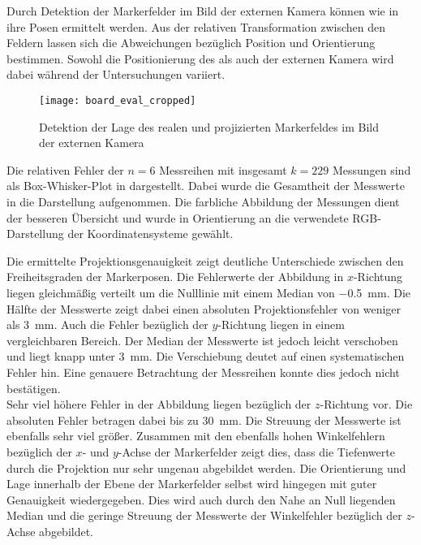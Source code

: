 Durch Detektion der Markerfelder im Bild der externen Kamera können wie in  ihre Posen ermittelt werden. Aus der relativen Transformation zwischen den Feldern lassen sich die Abweichungen bezüglich Position und Orientierung bestimmen. Sowohl die Positionierung des  als auch der externen Kamera wird dabei während der Untersuchungen variiert.\\

\begin{figure}[!ht]
	\begin{center}
		\texttt{[image: board\_eval\_cropped]}
		\caption{Detektion der Lage des realen und projizierten Markerfeldes im Bild der externen Kamera}
		\label{fig.arprojected}
	\end{center}
\end{figure}

Die relativen Fehler der $n=6$ Messreihen mit insgesamt $k=229$ Messungen sind als Box-Whisker-Plot in  dargestellt. Dabei wurde die Gesamtheit der Messwerte in die Darstellung aufgenommen. Die farbliche Abbildung der Messungen dient der besseren Übersicht und wurde in Orientierung an die verwendete RGB-Darstellung der Koordinatensysteme gewählt.



Die ermittelte Projektionsgenauigkeit zeigt deutliche Unterschiede zwischen den Freiheitsgraden der Markerposen. Die Fehlerwerte der Abbildung in $x$-Richtung liegen gleichmäßig verteilt um die Nulllinie mit einem Median von \SI{-0.5}{\milli\meter}. Die Hälfte der Messwerte zeigt dabei einen absoluten Projektionsfehler von weniger als \SI{3}{\milli\meter}. Auch die Fehler bezüglich der $y$-Richtung liegen in einem vergleichbaren Bereich. Der Median der Messwerte ist jedoch leicht verschoben und liegt knapp unter \SI{3}{\milli\meter}. Die Verschiebung deutet auf einen systematischen Fehler hin. Eine genauere Betrachtung der Messreihen konnte dies jedoch nicht bestätigen.\\

Sehr viel höhere Fehler in der Abbildung liegen bezüglich der $z$-Richtung vor. Die absoluten Fehler betragen dabei bis zu \SI{30}{\milli\meter}. Die Streuung der Messwerte ist ebenfalls sehr viel größer. Zusammen mit den ebenfalls hohen Winkelfehlern bezüglich der $x$- und $y$-Achse der Markerfelder zeigt dies, dass die Tiefenwerte durch die Projektion nur sehr ungenau abgebildet werden. Die Orientierung und Lage innerhalb der Ebene der Markerfelder selbst wird hingegen mit guter Genauigkeit wiedergegeben. Dies wird auch durch den Nahe an Null liegenden Median und die geringe Streuung der Messwerte der Winkelfehler bezüglich der $z$-Achse abgebildet.\\

